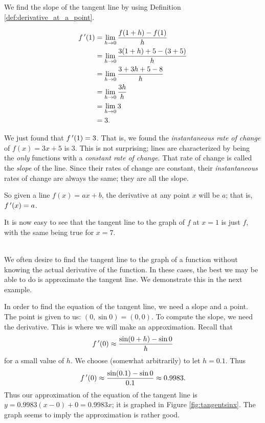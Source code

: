 {We find the slope of the tangent line by using Definition \ref{def:derivative_at_a_point}.

	\begin{align*}
	f\,'(1) &=	\lim_{h\to 0}\frac{f(1+h)-f(1)}{h} \\
					&=	\lim_{h\to 0} \frac{3(1+h)+5 - (3+5)}{h}\\
					&=	\lim_{h\to 0} \frac{3+3h+5 - 8}{h}\\
					&=	\lim_{h\to 0} \frac{3h}{h}\\
					&=	\lim_{h\to 0} 3\\
					&= 3.
	\end{align*}
	
We just found that $f\,'(1) = 3$. That is, we found the \textit{instantaneous rate of change} of $f(x) = 3x+5$ is $3$. This is not surprising; lines are characterized by being the \textit{only} functions with a \textit{constant rate of change.} That rate of change is called the \textit{slope} of the line. Since their rates of change are constant, their \textit{instantaneous} rates of  change are always the same; they are all the slope.

So given a line $f(x) = ax+b$, the derivative at any point $x$ will be $a$; that is, $f\,'(x) = a$. 

It is now easy to see that the tangent line to the graph of $f$ at $x=1$ is just $f$, with the same being true for $x=7$.
}\\

\enlargethispage{2\baselineskip}
We often desire to find the tangent line to the graph of a function without knowing the actual derivative of the function. In these cases, the best we may be able to do is approximate the tangent line. We demonstrate this in the next example.\\

{In order to find the equation of the tangent line, we need a slope and a point. The point is given to us: $(0,\sin 0) = (0,0)$. To compute the slope, we need the derivative. This is where we will make an approximation. Recall that $$f\,'(0) \approx \frac{\sin(0+h)- \sin 0}{h}$$ for a small value of $h$. We choose (somewhat arbitrarily) to let $h=0.1$. Thus $$f\,'(0) \approx \frac{\sin(0.1)-\sin 0}{0.1} \approx 0.9983.$$
Thus our approximation of the equation of the tangent line is $y = 0.9983(x-0) +0 = 0.9983x$; it is graphed in Figure \ref{fig:tangentsinx}. The graph seems to imply the approximation is rather good.
}\\

